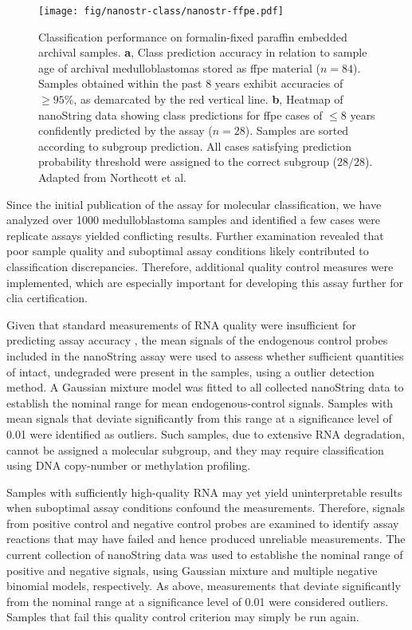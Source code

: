 \begin{figure}[ht]
	\begin{center}
		\texttt{[image: fig/nanostr-class/nanostr-ffpe.pdf]}
	\end{center}
	\caption[Classification performance on formalin-fixed paraffin embedded archival samples]
	{
	Classification performance on formalin-fixed paraffin embedded archival samples.
	\textbf{a}, Class prediction accuracy in relation to sample age of archival medulloblastomas stored as \gls{ffpe} material ($n = 84$). Samples obtained within the past 8 years exhibit accuracies of $\geq 95\%$, as demarcated by the red vertical line.
	\textbf{b}, Heatmap of nanoString data showing class predictions for \gls{ffpe} cases of $\leq 8$ years confidently predicted by the assay ($n = 28$). Samples are sorted according to subgroup prediction. All cases satisfying prediction probability threshold were assigned to the correct subgroup ($28/28$). Adapted from Northcott et al.
	}
	\label{fig:nanostr-ffpe}
\end{figure}

Since the initial publication of the assay for molecular classification, we have analyzed over 1000 medulloblastoma samples and identified a few cases were replicate assays yielded conflicting results. Further examination revealed that poor sample quality and suboptimal assay conditions likely contributed to classification discrepancies. Therefore, additional quality control measures were implemented, which are especially important for developing this assay further for \gls{clia} certification.

Given that standard measurements of RNA quality were insufficient for predicting assay accuracy , the mean signals of the endogenous control probes included in the nanoString assay were used to assess whether sufficient quantities of intact, undegraded were present in the samples, using a outlier detection method. A Gaussian mixture model was fitted to all collected nanoString data to establish the nominal range for mean endogenous-control signals. Samples with mean signals that deviate significantly from this range at a significance level of 0.01 were identified as outliers. Such samples, due to extensive RNA degradation, cannot be assigned a molecular subgroup, and they may require classification using DNA copy-number or methylation profiling.

Samples with sufficiently high-quality RNA may yet yield uninterpretable results when suboptimal assay conditions confound the measurements. Therefore, signals from positive control and negative control probes are examined to identify assay reactions that may have failed and hence produced unreliable measurements. The current collection of nanoString data was used to establishe the nominal range of positive and negative signals, using Gaussian mixture and multiple negative binomial models, respectively. As above, measurements that deviate significantly from the nominal range at a significance level of 0.01 were considered outliers. Samples that fail this quality control criterion may simply be run again.


